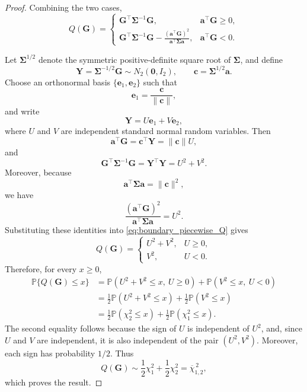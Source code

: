 \documentclass[11pt]{article}
\theoremstyle{remark}
\newcommand{\Pp}{\mathbb{P}}
\newcommand{\barchi}[2]{\overline{\chi}^{\,2}_{#1,#2}}
\begin{document}
\begin{proof}
Combining the two cases,
\begin{equation}
Q(\boldsymbol{G})
=
\begin{cases}
\boldsymbol{G}^{\top}
\boldsymbol{\Sigma}^{-1}
\boldsymbol{G},
&
\boldsymbol{a}^{\top}\boldsymbol{G}\geq 0,
\\[1.2ex]
\displaystyle
\boldsymbol{G}^{\top}
\boldsymbol{\Sigma}^{-1}
\boldsymbol{G}
-
\frac{
(\boldsymbol{a}^{\top}\boldsymbol{G})^{2}
}{
\boldsymbol{a}^{\top}\boldsymbol{\Sigma}\boldsymbol{a}
},
&
\boldsymbol{a}^{\top}\boldsymbol{G}<0.
\end{cases}
\label{eq:boundary_piecewise_Q}
\end{equation}

Let $\boldsymbol{\Sigma}^{1/2}$ denote the symmetric positive-definite square root of $\boldsymbol{\Sigma}$, and define
$$
\boldsymbol{Y}
=
\boldsymbol{\Sigma}^{-1/2}\boldsymbol{G}
\sim N_2(\boldsymbol{0},I_2),
\qquad
\boldsymbol{c}
=
\boldsymbol{\Sigma}^{1/2}\boldsymbol{a}.
$$
Choose an orthonormal basis
$\{\boldsymbol{e}_1,\boldsymbol{e}_2\}$ such that
$$
\boldsymbol{e}_1
=
\frac{\boldsymbol{c}}{\|\boldsymbol{c}\|},
$$
and write
$$
\boldsymbol{Y}
=
U\boldsymbol{e}_1
+
V\boldsymbol{e}_2,
$$
where $U$ and $V$ are independent standard normal random variables. Then
$$
\boldsymbol{a}^{\top}\boldsymbol{G}
=
\boldsymbol{c}^{\top}\boldsymbol{Y}
=
\|\boldsymbol{c}\|U,
$$
and
$$
\boldsymbol{G}^{\top}
\boldsymbol{\Sigma}^{-1}
\boldsymbol{G}
=
\boldsymbol{Y}^{\top}\boldsymbol{Y}
=
U^2+V^2.
$$
Moreover, because
$$
\boldsymbol{a}^{\top}\boldsymbol{\Sigma}\boldsymbol{a}
=
\|\boldsymbol{c}\|^2,
$$
we have
$$
\frac{
(\boldsymbol{a}^{\top}\boldsymbol{G})^2
}{
\boldsymbol{a}^{\top}\boldsymbol{\Sigma}\boldsymbol{a}
}
=
U^2.
$$
Substituting these identities into
\eqref{eq:boundary_piecewise_Q} gives
$$
Q(\boldsymbol{G})
=
\begin{cases}
U^2+V^2,
&
U\geq 0,
\\
V^2,
&
U<0.
\end{cases}
$$
Therefore, for every $x\geq 0$,
\begin{align*}
\Pp\{Q(\boldsymbol{G})\leq x\}
&=
\Pp(U^2+V^2\leq x,\ U\geq 0)
+
\Pp(V^2\leq x,\ U<0)
\\
&=
\frac{1}{2}\Pp(U^2+V^2\leq x)
+
\frac{1}{2}\Pp(V^2\leq x)
\\
&=
\frac{1}{2}\Pp(\chi_2^2\leq x)
+
\frac{1}{2}\Pp(\chi_1^2\leq x).
\end{align*}
The second equality follows because the sign of $U$ is independent of $U^2$, and, since $U$ and $V$ are independent, it is also independent of the pair $(U^2,V^2)$. Moreover, each sign has probability $1/2$. Thus
$$
Q(\boldsymbol{G})
\sim
\frac{1}{2}\chi_1^2
+
\frac{1}{2}\chi_2^2
=
\barchi{1}{2},
$$
which proves the result.

\end{proof}
\end{document}
